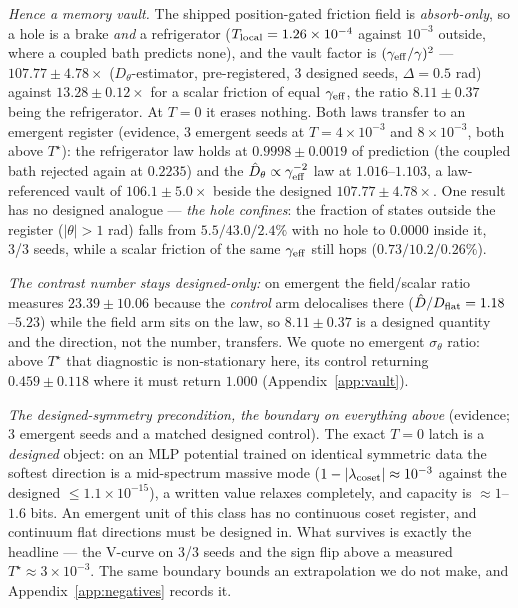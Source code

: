 \documentclass{article}
\begin{document}
\emph{Hence a memory vault.} The shipped position-gated friction field is \emph{absorb-only}, so a hole is a brake \emph{and} a refrigerator ($T_{\rm local}=1.26\times10^{-4}$ against $10^{-3}$ outside, where a coupled bath predicts none), and the vault factor is $(\gamma_{\rm eff}/\gamma)^2$ --- $107.77\pm4.78\times$ ($D_\theta$-estimator, pre-registered, 3 designed seeds, $\Delta=0.5$ rad) against $13.28\pm0.12\times$ for a scalar friction of equal $\gamma_{\rm eff}$, the ratio $8.11\pm0.37$ being the refrigerator. At $T=0$ it erases nothing. Both laws transfer to an emergent register (evidence, 3 emergent seeds at $T=4\times10^{-3}$ and $8\times10^{-3}$, both above $T^\star$): the refrigerator law holds at $0.9998\pm0.0019$ of prediction (the coupled bath rejected again at $0.2235$) and the $\hat D_\theta\propto\gamma_{\rm eff}^{-2}$ law at $1.016$--$1.103$, a law-referenced vault of $106.1\pm5.0\times$ beside the designed $107.77\pm4.78\times$. One result has no designed analogue --- \emph{the hole confines}: the fraction of states outside the register ($|\theta|>1$ rad) falls from $5.5/43.0/2.4\%$ with no hole to $0.0000$ inside it, 3/3 seeds, while a scalar friction of the same $\gamma_{\rm eff}$ still hops ($0.73/10.2/0.26\%$). {\footnotesize\emph{The contrast number stays designed-only:} on emergent the field/scalar ratio measures $23.39\pm10.06$ because the \emph{control} arm delocalises there ($\hat D/D_{\rm flat}=1.18$--$5.23$) while the field arm sits on the law, so $8.11\pm0.37$ is a designed quantity and the direction, not the number, transfers. We quote no emergent $\sigma_\theta$ ratio: above $T^\star$ that diagnostic is non-stationary here, its control returning $0.459\pm0.118$ where it must return $1.000$ (Appendix~\ref{app:vault}).\par} \emph{The designed-symmetry precondition, the boundary on everything above} (evidence; 3 emergent seeds and a matched designed control). The exact $T=0$ latch is a \emph{designed} object: on an MLP potential trained on identical symmetric data the softest direction is a mid-spectrum massive mode ($1-|\lambda_{\rm coset}|\approx10^{-3}$ against the designed $\le1.1\times10^{-15}$), a written value relaxes completely, and capacity is $\approx1$--$1.6$ bits. An emergent unit of this class has no continuous coset register, and continuum flat directions must be designed in. What survives is exactly the headline --- the V-curve on 3/3 seeds and the sign flip above a measured $T^\star\approx3\times10^{-3}$. The same boundary bounds an extrapolation we do not make, and Appendix~\ref{app:negatives} records it.
\end{document}
